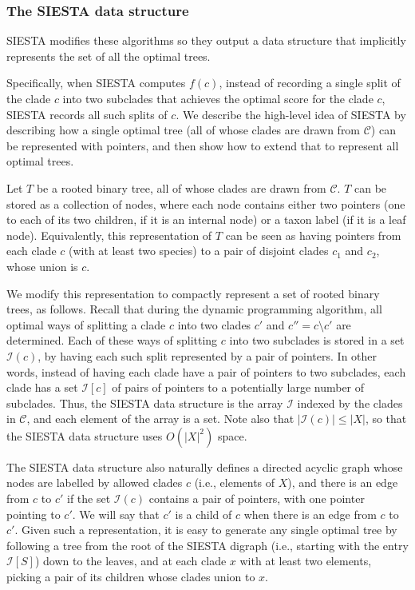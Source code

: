 \subsubsection{The SIESTA data structure}

SIESTA modifies these algorithms so they output a data structure that implicitly represents the set of all the optimal trees.

Specifically, when SIESTA computes $f(c)$, instead of recording a single split of the clade $c$ into two subclades that achieves the optimal score for the clade $c$, SIESTA records all such splits of $c$.
We describe the high-level idea of SIESTA  by describing how a single optimal tree (all of whose clades are drawn from $\mathcal{C}$) can be represented with pointers, and then show how to extend that to represent all optimal trees. 

Let $T$ be a rooted binary  tree, all of whose clades are drawn from $\mathcal{C}$. 
$T$ can be stored as a collection of nodes, where each node contains either two  pointers (one to each of its two children, if it is an internal node) or a taxon label (if it is a leaf node). 
Equivalently, this representation of $T$ can be seen as having pointers from each clade $c$ (with at least two species) to a pair of disjoint clades $c_1$ and $c_2$, whose union is $c$.


We modify this representation to compactly represent  a set of rooted binary trees, as follows. 
Recall that during the dynamic programming algorithm, all optimal ways of splitting a clade $c$ into two clades $c'$ and $c''=c \setminus c'$ are determined. Each of these ways of splitting $c$ into two subclades is stored in a set $\mathcal{I}(c)$, by having each such split represented by a pair of pointers. In other words, 
instead of having each clade have a pair of pointers to  two  subclades,  each clade has a set $\mathcal{I}[c]$ of pairs of pointers to a potentially large number of subclades.  
Thus, the SIESTA data structure is the array $\mathcal{I}$ indexed by the clades in $\mathcal{C}$, and each element of the array is a set.
Note also  that $|\mathcal{I}(c)| \leq |X|$, so that the SIESTA data structure uses $O(|X|^2)$ space.


The SIESTA data structure also naturally defines a directed acyclic graph whose nodes are labelled by allowed clades  $c$ (i.e., elements of $X$), and there is an edge from $c$ to $c'$ if the set $\mathcal{I}(c)$ contains a pair of pointers, with one pointer pointing to $c'$. 
We will say that $c'$ is a child of $c$ when there is an edge from $c$ to $c'$.
Given such a representation, it is easy to generate any single optimal tree by following a tree from the root of the SIESTA digraph (i.e., starting with the entry  $\mathcal{I}[S]$)  down to the leaves, and at each clade  $x$ with at least two elements, picking a pair of its children whose clades union to $x$.

